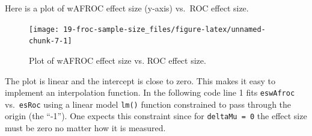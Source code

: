 \documentclass[
]{book}
\newenvironment{Shaded}{\begin{snugshade}}{\end{snugshade}}
\newcommand{\AttributeTok}[1]{\textcolor[rgb]{0.77,0.63,0.00}{#1}}
\newcommand{\CommentTok}[1]{\textcolor[rgb]{0.56,0.35,0.01}{\textit{#1}}}
\newcommand{\ControlFlowTok}[1]{\textcolor[rgb]{0.13,0.29,0.53}{\textbf{#1}}}
\newcommand{\DecValTok}[1]{\textcolor[rgb]{0.00,0.00,0.81}{#1}}
\newcommand{\FloatTok}[1]{\textcolor[rgb]{0.00,0.00,0.81}{#1}}
\newcommand{\FunctionTok}[1]{\textcolor[rgb]{0.00,0.00,0.00}{#1}}
\newcommand{\NormalTok}[1]{#1}
\newcommand{\OtherTok}[1]{\textcolor[rgb]{0.56,0.35,0.01}{#1}}
\newcommand{\SpecialCharTok}[1]{\textcolor[rgb]{0.00,0.00,0.00}{#1}}
\begin{document}
\begin{Shaded}
\end{Shaded}

Here is a plot of wAFROC effect size (y-axis) vs.~ROC effect size.

\begin{figure}

{\centering \texttt{[image: 19-froc-sample-size\_files/figure-latex/unnamed-chunk-7-1]} 

}

\caption{Plot of wAFROC effect size vs. ROC effect size.}\label{fig:unnamed-chunk-7}
\end{figure}

The plot is linear and the intercept is close to zero. This makes it easy to implement an interpolation function. In the following code line 1 fits \texttt{eswAfroc} vs.~\texttt{esRoc} using a linear model \texttt{lm()} function constrained to pass through the origin (the ``-1''). One expects this constraint since for \texttt{deltaMu\ =\ 0} the effect size must be zero no matter how it is measured.
\end{document}
